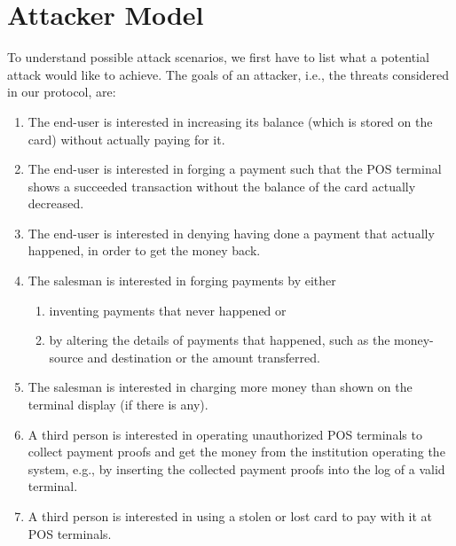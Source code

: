 \section{Attacker Model}\label{attackerModel}
To understand possible attack scenarios, we first have to list what a potential attack would like to achieve.
The goals of an attacker, i.e., the threats considered in our protocol, are:
\begin{enumerate}[label={T\arabic*:}, leftmargin=2\parindent, ref={T\arabic*}]
    \item \label{threat:increaseWithoutPaying}
    The end-user is interested in increasing its balance (which is stored on the card) without actually paying for it.
    
    \item \label{threat:payWithoutDecrease}
    The end-user is interested in forging a payment such that the POS terminal shows a succeeded transaction without the balance of the card actually decreased.
    
    \item \label{threat:denyPayment}
    The end-user is interested in denying having done a payment that actually happened, in order to get the money back.
    
    \item \label{threat:forgingPayments} The salesman is interested in forging payments by either 
    \begin{enumerate}[ref={\theenumi~\alph*}]
        \item \label{threat:inventNewPayments}
        inventing payments that never happened or
        \item \label{threat:alterPaymentDetails}
        by altering the details of payments that happened, such as the money-source and destination or the amount transferred.
    \end{enumerate}
        
    \item \label{threat:chargeMoreThanDisplayed}
    The salesman is interested in charging more money than shown on the terminal display (if there is any).

    \item \label{threat:invaldTermial} A third person is interested in operating unauthorized POS terminals to collect payment proofs and get the money from the institution operating the system, e.g., by inserting the collected payment proofs into the log of a valid terminal.

    \item \label{threat:stolenCard} A third person is interested in using a stolen or lost card to pay with it at POS terminals.
\end{enumerate}

